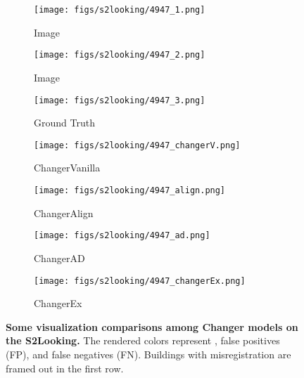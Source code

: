 \documentclass[10pt,twocolumn,letterpaper]{article}
\begin{document}
\begin{figure*}
  \hfill
  \begin{subfigure}{0.138\linewidth}
    \texttt{[image: figs/s2looking/4947\_1.png]}
    \caption{ Image}
    \label{fig:short-b1}
  \end{subfigure}
  \hfill
  \begin{subfigure}{0.138\linewidth}
    \texttt{[image: figs/s2looking/4947\_2.png]}
    \caption{ Image}
    \label{fig:short-b2}
  \end{subfigure}
  \hfill
  \begin{subfigure}{0.138\linewidth}
    \texttt{[image: figs/s2looking/4947\_3.png]}
    \caption{Ground Truth}
    \label{fig:short-b3}
  \end{subfigure}
  \hfill
  \begin{subfigure}{0.138\linewidth}
    \texttt{[image: figs/s2looking/4947\_changerV.png]}
    \caption{ChangerVanilla}
    \label{fig:short-b4}
  \end{subfigure}
  \hfill
  \begin{subfigure}{0.138\linewidth}
    \texttt{[image: figs/s2looking/4947\_align.png]}
    \caption{ChangerAlign}
    \label{fig:short-b5}
  \end{subfigure}
  \hfill
  \begin{subfigure}{0.138\linewidth}
    \texttt{[image: figs/s2looking/4947\_ad.png]}
    \caption{ChangerAD}
    \label{fig:short-b6}
  \end{subfigure}
  \hfill
  \begin{subfigure}{0.138\linewidth}
    \texttt{[image: figs/s2looking/4947\_changerEx.png]}
    \caption{ChangerEx}
    \label{fig:short-b7}
  \end{subfigure}
  
  \caption{\textbf{Some visualization comparisons among Changer models on the S2Looking.} The rendered colors represent {\color{green}{true positives (TP)}}, {\color{yellow}false positives (FP)}, and {\color{red}false negatives (FN)}. Buildings with misregistration are framed out in the first row.}
  \label{fig:s2looking}
\end{figure*}
\end{document}
